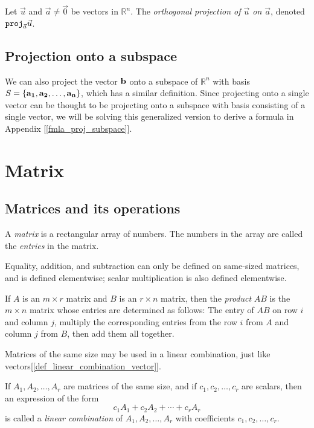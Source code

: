 \documentclass{report}
\begin{document}
		\begin{defn}[Projection]
			Let $\vec{u}$ and $\vec{a} \ne \vec{0}$ be vectors in $\mathbb{R}^n$. The \emph{orthogonal projection of $\vec{u}$ on $\vec{a}$}, denoted $\verb|proj|_{\vec{a}}\vec{u}$.
		\end{defn}
		
		\subsection{Projection onto a subspace}
			We can also project the vector $\bf{b}$ onto a subspace of $\mathbb{R}^n$ with basis $S=\{\bf{a_1},\bf{a_2},\dots,\bf{a_n}\}$, which has a similar definition. Since projecting onto a single vector can be thought to be projecting onto a subspace with basis consisting of a single vector, we will be solving this generalized version to derive a formula in Appendix [\ref{fmla_proj_subspace}].
	
	\section{Matrix}
		\subsection{Matrices and its operations}
			\begin{defn}[Matrix]
				A \emph{matrix} is a rectangular array of numbers. The numbers in the array are called the \emph{entries} in the matrix.
			\end{defn}
		
			Equality, addition, and subtraction can only be defined on same-sized matrices, and is defined elementwise; scalar multiplication is also defined elementwise.
			
			\begin{defn}
				If $A$ is an $m \times r$ matrix and $B$ is an $r \times n$ matrix, then the \emph{product} $AB$ is the $m \times n$ matrix whose entries are determined as follows:
				The entry of $AB$ on row $i$ and column $j$, multiply the corresponding entries from the row $i$ from $A$ and column $j$ from $B$, then add them all together.
			\end{defn}
		
			Matrices of the same size may be used in a linear combination, just like vectors[\ref{def_linear_combination_vector}].
			
			\begin{defn}
				If $A_1, A_2, \dots, A_r$ are matrices of the same size, and if $c_1, c_2, \dots, c_r$ are scalars, then an expression of the form
				\begin{displaymath}
					c_1A_1+c_2A_2+\cdots+c_rA_r
				\end{displaymath}
				is called a \emph{linear combination} of $A_1, A_2, \dots, A_r$ with coefficients $c_1, c_2, \dots, c_r$.
			\end{defn}
			
\end{document}
